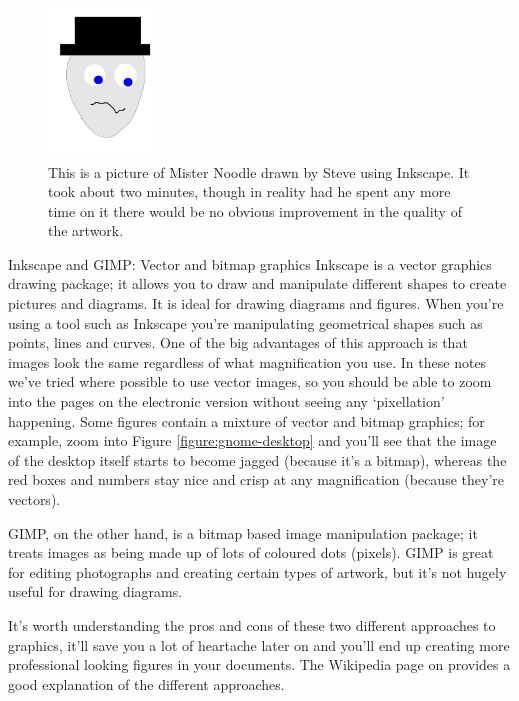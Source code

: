 \begin{figure}[t]
\centerline{\includegraphics[width=0.25\textwidth]{images/mrnoodle}}
\caption{This is a picture of Mister Noodle drawn by Steve using Inkscape. It took about two minutes, though in reality had he spent any more time on it there would be no obvious improvement in the quality of the artwork.}\label{figure:mrnoodle}
\end{figure}

\begin{diversion}{Inkscape and GIMP: Vector and bitmap graphics}
Inkscape is a vector graphics drawing package; it allows you to draw and manipulate different shapes to create pictures and diagrams. It is ideal for drawing diagrams and figures. When you're using a tool such as Inkscape you're manipulating geometrical shapes such as points, lines and curves. One of the big advantages of this approach is that images look the same regardless of what magnification you use. In these notes we've tried where possible to use vector images, so you should be able to zoom into the pages on the electronic version without seeing any `pixellation' happening. Some figures contain a mixture of vector and bitmap graphics; for example, zoom into Figure \ref{figure:gnome-desktop} and you'll see that the image of the desktop itself starts to become jagged (because it's a bitmap), whereas the red boxes and numbers stay nice and crisp at any magnification (because they're vectors).

GIMP, on the other hand, is a bitmap based image manipulation package; it treats images as being made up of lots of coloured dots (pixels). GIMP is great for editing photographs and creating certain types of artwork, but it's not hugely useful for drawing diagrams.

It's worth understanding the pros and cons of these two different approaches to graphics, it'll save you a lot of heartache later on and you'll end up creating more professional looking figures in your documents. The Wikipedia page on  provides a good explanation of the different approaches.

\end{diversion}

